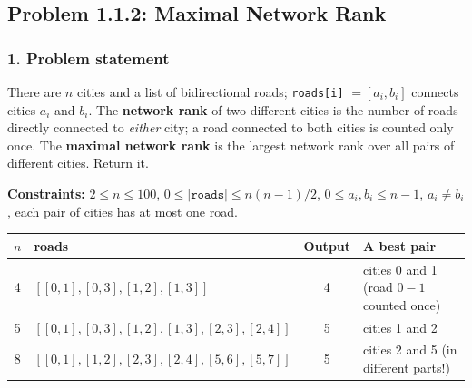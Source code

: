 \subsection{Problem 1.1.2: Maximal Network Rank}


\subsubsection*{1. Problem statement}

There are $n$ cities and a list of bidirectional roads; \texttt{roads[i]} $= [a_i, b_i]$ connects cities $a_i$ and $b_i$. The \textbf{network rank} of two different cities is the number of roads directly connected to \emph{either} city; a road connected to both cities is counted only once. The \textbf{maximal network rank} is the largest network rank over all pairs of different cities. Return it.

\textbf{Constraints:} $2 \le n \le 100$, \; $0 \le |\texttt{roads}| \le n(n-1)/2$, \; $0 \le a_i, b_i \le n-1$, \; $a_i \ne b_i$, \; each pair of cities has at most one road.

\begin{table}[H]
\centering\small
\begin{tabular}{@{}clcl@{}}
\toprule
$n$ & \textbf{roads} & \textbf{Output} & \textbf{A best pair} \\
\midrule
4 & $[[0,1],[0,3],[1,2],[1,3]]$ & 4 & cities 0 and 1 (road $0{-}1$ counted once) \\
5 & $[[0,1],[0,3],[1,2],[1,3],[2,3],[2,4]]$ & 5 & cities 1 and 2 \\
8 & $[[0,1],[1,2],[2,3],[2,4],[5,6],[5,7]]$ & 5 & cities 2 and 5 (in different parts!) \\
\bottomrule
\end{tabular}
\end{table}

